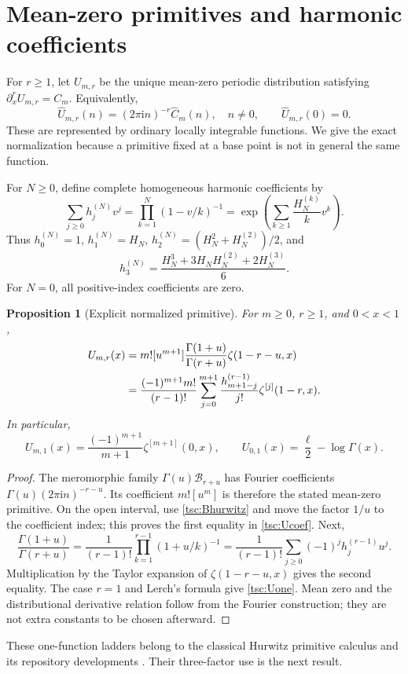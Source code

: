 \documentclass[11pt]{article}
\numberwithin{equation}{section}
\newtheorem{proposition}[theorem]{Proposition}
\theoremstyle{definition}\newtheorem{definition}[theorem]{Definition}
\theoremstyle{remark}\newtheorem{remark}[theorem]{Remark}
\newcommand{\ii}{\mathrm i}
\newcommand{\calB}{\mathcal B}
\begin{document}
\section{Mean-zero primitives and harmonic coefficients}\label{tsc:primitives}
For $r\ge1$, let $U_{m,r}$ be the unique mean-zero periodic distribution
satisfying $\partial_x^r U_{m,r}=C_m$. Equivalently,
\[
 \widehat U_{m,r}(n)=(2\pi\ii n)^{-r}\widehat C_m(n),\quad n\ne0,
 \qquad \widehat U_{m,r}(0)=0.
\]
These are represented by ordinary locally integrable functions. We give
the exact normalization because a primitive fixed at a base point is not
in general the same function.

For $N\ge0$, define complete homogeneous harmonic coefficients by
\begin{equation}\label{tsc:homogeneous}
 \sum_{j\ge0}h_j^{(N)}v^j
     =\prod_{k=1}^N(1-v/k)^{-1}
     =\exp\left(\sum_{k\ge1}\frac{H_N^{(k)}}k v^k\right).
\end{equation}
Thus $h_0^{(N)}=1$, $h_1^{(N)}=H_N$,
$h_2^{(N)}=(H_N^2+H_N^{(2)})/2$, and
\[
 h_3^{(N)}=\frac{H_N^3+3H_NH_N^{(2)}+2H_N^{(3)}}6.
\]
For $N=0$, all positive-index coefficients are zero.

\begin{proposition}[Explicit normalized primitive]\label{tsc:primitive-formula}
For $m\ge0$, $r\ge1$, and $0<x<1$,
\begin{align}\label{tsc:Ucoef}
 U_{m,r}(x)
 &=m![u^{m+1}]\frac{\Gamma(1+u)}{\Gamma(r+u)}\zeta(1-r-u,x)\notag\\
 &=\frac{(-1)^{m+1}m!}{(r-1)!}
       \sum_{j=0}^{m+1}\frac{h_{m+1-j}^{(r-1)}}{j!}
                   \zeta^{[j]}(1-r,x).
\end{align}
In particular,
\begin{equation}\label{tsc:Uone}
 U_{m,1}(x)=\frac{(-1)^{m+1}}{m+1}\zeta^{[m+1]}(0,x),
 \qquad U_{0,1}(x)=\frac\ell2-\log\Gamma(x).
\end{equation}
\end{proposition}
\begin{proof}
The meromorphic family $\Gamma(u)\calB_{r+u}$ has Fourier coefficients
$\Gamma(u)(2\pi\ii n)^{-r-u}$. Its coefficient $m![u^m]$ is therefore
the stated mean-zero primitive. On the open interval, use
\eqref{tsc:Bhurwitz} and move the factor $1/u$ to the coefficient index;
this proves the first equality in \eqref{tsc:Ucoef}. Next,
\[
 \frac{\Gamma(1+u)}{\Gamma(r+u)}
   =\frac1{(r-1)!}\prod_{k=1}^{r-1}(1+u/k)^{-1}
   =\frac1{(r-1)!}\sum_{j\ge0}(-1)^jh_j^{(r-1)}u^j.
\]
Multiplication by the Taylor expansion of $\zeta(1-r-u,x)$ gives the second
equality. The case $r=1$ and Lerch's formula give \eqref{tsc:Uone}.
Mean zero and the distributional derivative relation follow from the Fourier
construction; they are not extra constants to be chosen afterward.
\end{proof}
These one-function ladders belong to the classical Hurwitz primitive
calculus and its repository developments \cite{tsc:em2,tsc:shj}. Their
three-factor use is the next result.
\end{document}
